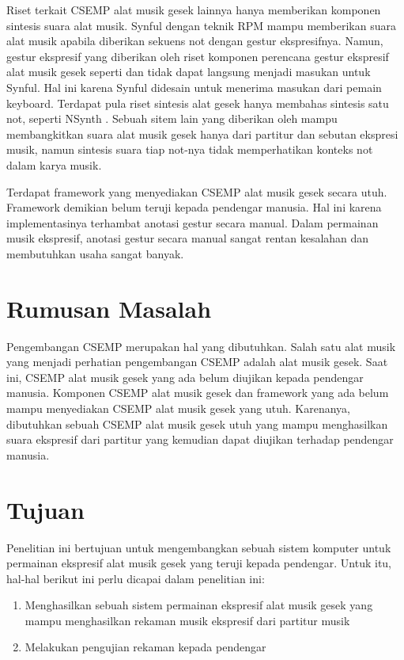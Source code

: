 Riset terkait CSEMP alat musik gesek lainnya hanya memberikan komponen sintesis suara alat musik. Synful dengan teknik RPM \parencite{lindemann2007rpm} mampu memberikan suara alat musik apabila diberikan sekuens not dengan gestur ekspresifnya. Namun, gestur ekspresif yang diberikan oleh riset komponen perencana gestur ekspresif alat musik gesek seperti \parencite{marchini2014quartet} dan \parencite{yu2017bowing} tidak dapat langsung menjadi masukan untuk Synful. Hal ini karena Synful didesain untuk menerima masukan dari pemain keyboard. Terdapat pula riset sintesis alat gesek hanya membahas sintesis satu not, seperti NSynth \parencite{nsynth2017}. Sebuah sitem lain yang diberikan oleh \parencite{yang2016synthesis} mampu membangkitkan suara alat musik gesek hanya dari partitur dan sebutan ekspresi musik, namun sintesis suara tiap not-nya tidak memperhatikan konteks not dalam karya musik.

Terdapat framework yang menyediakan CSEMP alat musik gesek secara utuh. \parencite{perez2015} Framework demikian belum teruji kepada pendengar manusia. Hal ini karena implementasinya terhambat anotasi gestur secara manual. Dalam permainan musik ekspresif, anotasi gestur secara manual sangat rentan kesalahan dan membutuhkan usaha sangat banyak.


\section{Rumusan Masalah}

Pengembangan CSEMP merupakan hal yang dibutuhkan. Salah satu alat musik yang menjadi perhatian pengembangan CSEMP adalah alat musik gesek. Saat ini, CSEMP alat musik gesek yang ada belum diujikan kepada pendengar manusia. Komponen CSEMP alat musik gesek dan framework yang ada belum mampu menyediakan CSEMP alat musik gesek yang utuh. Karenanya, dibutuhkan sebuah CSEMP alat musik gesek utuh yang mampu menghasilkan suara ekspresif dari partitur yang kemudian dapat diujikan terhadap pendengar manusia.

\section{Tujuan}

Penelitian ini bertujuan untuk mengembangkan sebuah sistem komputer untuk permainan ekspresif alat musik gesek yang teruji kepada pendengar. Untuk itu, hal-hal berikut ini perlu dicapai dalam penelitian ini:
\begin{enumerate}
	\item Menghasilkan sebuah sistem permainan ekspresif alat musik gesek yang mampu menghasilkan rekaman musik ekspresif dari partitur musik
	\item Melakukan pengujian rekaman kepada pendengar
\end{enumerate}

